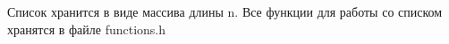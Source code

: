Список хранится в виде массива длины n. Все функции для работы со списком хранятся в файле functions.\-h 
